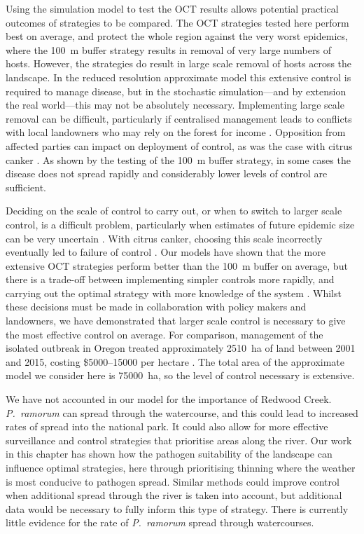 Using the simulation model to test the OCT results allows potential practical outcomes of strategies to be compared. The OCT strategies tested here perform best on average, and protect the whole region against the very worst epidemics, where the \SI{100}{\meter} buffer strategy results in removal of very large numbers of hosts. However, the strategies do result in large scale removal of hosts across the landscape. In the reduced resolution approximate model this extensive control is required to manage disease, but in the stochastic simulation---and by extension the real world---this may not be absolutely necessary. Implementing large scale removal can be difficult, particularly if centralised management leads to conflicts with local landowners who may rely on the forest for income \citep{alexander_lessons_2010}. Opposition from affected parties can impact on deployment of control, as was the case with citrus canker \citep{gottwald_citrus_2007}. As shown by the testing of the \SI{100}{\meter} buffer strategy, in some cases the disease does not spread rapidly and considerably lower levels of control are sufficient. 

Deciding on the scale of control to carry out, or when to switch to larger scale control, is a difficult problem, particularly when estimates of future epidemic size can be very uncertain \citep{neri_bayesian_2014}. With citrus canker, choosing this scale incorrectly eventually led to failure of control \citep{gottwald_citrus_2007}. Our models have shown that the more extensive OCT strategies perform better than the \SI{100}{\meter} buffer on average, but there is a trade-off between implementing simpler controls more rapidly, and carrying out the optimal strategy with more knowledge of the system \citep{thompson_control_2018}. Whilst these decisions must be made in collaboration with policy makers and landowners, we have demonstrated that larger scale control is necessary to give the most effective control on average. For comparison, management of the isolated outbreak in Oregon treated approximately \SI{2510}{\hectare} of land between 2001 and 2015, costing \$5000--15000 per hectare \citep{goheen_sudden_2017}. The total area of the approximate model we consider here is \SI{75000}{\hectare}, so the level of control necessary is extensive.

We have not accounted in our model for the importance of Redwood Creek. \emph{P.~ramorum} can spread through the watercourse, and this could lead to increased rates of spread into the national park. It could also allow for more effective surveillance and control strategies that prioritise areas along the river. Our work in this chapter has shown how the pathogen suitability of the landscape can influence optimal strategies, here through prioritising thinning where the weather is most conducive to pathogen spread. Similar methods could improve control when additional spread through the river is taken into account, but additional data would be necessary to fully inform this type of strategy. There is currently little evidence for the rate of \emph{P.~ramorum} spread through watercourses.

